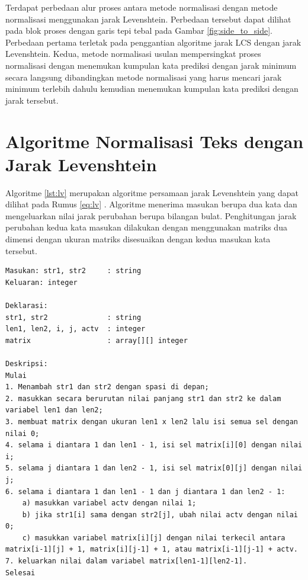Terdapat perbedaan alur proses antara metode normalisasi \parencite{saragih2017normalisasi} dengan metode normalisasi menggunakan jarak Levenshtein. Perbedaan tersebut dapat dilihat pada blok proses dengan garis tepi tebal pada Gambar \ref{fig:side_to_side}. Perbedaan pertama terletak pada penggantian algoritme jarak LCS dengan jarak Levenshtein. Kedua, metode normalisasi usulan mempersingkat proses normalisasi dengan menemukan kumpulan kata prediksi dengan jarak minimum secara langsung dibandingkan metode normalisasi \parencite{saragih2017normalisasi} yang harus mencari jarak minimum terlebih dahulu kemudian menemukan kumpulan kata prediksi dengan jarak tersebut.

\section{Algoritme Normalisasi Teks dengan Jarak Levenshtein}

Algoritme \ref{lst:lv} merupakan algoritme persamaan jarak Levenshtein yang dapat dilihat pada Rumus \ref{eq:lv} \parencite{levenshtein1966binary}. Algoritme menerima masukan berupa dua kata dan mengeluarkan nilai jarak perubahan berupa bilangan bulat. Penghitungan jarak perubahan kedua kata masukan dilakukan dengan menggunakan matriks dua dimensi dengan ukuran matriks disesuaikan dengan kedua masukan kata tersebut.
\begin{lstlisting}[caption={Algoritme Fungsi Jarak Levenshtein},label={lst:lv},float,floatplacement=H]
Masukan: str1, str2		: string
Keluaran: integer

Deklarasi:
str1, str2 				: string
len1, len2, i, j, actv 	: integer
matrix					: array[][] integer

Deskripsi:
Mulai
1. Menambah str1 dan str2 dengan spasi di depan;
2. masukkan secara berurutan nilai panjang str1 dan str2 ke dalam variabel len1 dan len2;
3. membuat matrix dengan ukuran len1 x len2 lalu isi semua sel dengan nilai 0;
4. selama i diantara 1 dan len1 - 1, isi sel matrix[i][0] dengan nilai i;
5. selama j diantara 1 dan len2 - 1, isi sel matrix[0][j] dengan nilai j;
6. selama i diantara 1 dan len1 - 1 dan j diantara 1 dan len2 - 1:
	a) masukkan variabel actv dengan nilai 1;
	b) jika str1[i] sama dengan str2[j], ubah nilai actv dengan nilai 0;
	c) masukkan variabel matrix[i][j] dengan nilai terkecil antara matrix[i-1][j] + 1, matrix[i][j-1] + 1, atau matrix[i-1][j-1] + actv.
7. keluarkan nilai dalam variabel matrix[len1-1][len2-1].
Selesai
\end{lstlisting}

